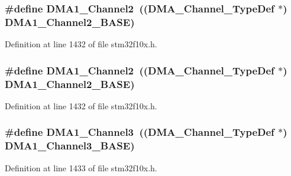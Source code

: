 \subsubsection[{\texorpdfstring{D\+M\+A1\+\_\+\+Channel2}{DMA1_Channel2}}]{\setlength{\rightskip}{0pt plus 5cm}\#define D\+M\+A1\+\_\+\+Channel2~(({\bf D\+M\+A\+\_\+\+Channel\+\_\+\+Type\+Def} $\ast$) {\bf D\+M\+A1\+\_\+\+Channel2\+\_\+\+B\+A\+SE})}\hypertarget{group___peripheral__declaration_ga23d7631dd10c645e06971b2543ba2949}{}\label{group___peripheral__declaration_ga23d7631dd10c645e06971b2543ba2949}


Definition at line 1432 of file stm32f10x.\+h.

\subsubsection[{\texorpdfstring{D\+M\+A1\+\_\+\+Channel2}{DMA1_Channel2}}]{\setlength{\rightskip}{0pt plus 5cm}\#define D\+M\+A1\+\_\+\+Channel2~(({\bf D\+M\+A\+\_\+\+Channel\+\_\+\+Type\+Def} $\ast$) {\bf D\+M\+A1\+\_\+\+Channel2\+\_\+\+B\+A\+SE})}\hypertarget{group___peripheral__declaration_ga23d7631dd10c645e06971b2543ba2949}{}\label{group___peripheral__declaration_ga23d7631dd10c645e06971b2543ba2949}


Definition at line 1432 of file stm32f10x.\+h.

\subsubsection[{\texorpdfstring{D\+M\+A1\+\_\+\+Channel3}{DMA1_Channel3}}]{\setlength{\rightskip}{0pt plus 5cm}\#define D\+M\+A1\+\_\+\+Channel3~(({\bf D\+M\+A\+\_\+\+Channel\+\_\+\+Type\+Def} $\ast$) {\bf D\+M\+A1\+\_\+\+Channel3\+\_\+\+B\+A\+SE})}\hypertarget{group___peripheral__declaration_gacf7b6093a37b306d7f1f50b2f200f0d0}{}\label{group___peripheral__declaration_gacf7b6093a37b306d7f1f50b2f200f0d0}


Definition at line 1433 of file stm32f10x.\+h.

